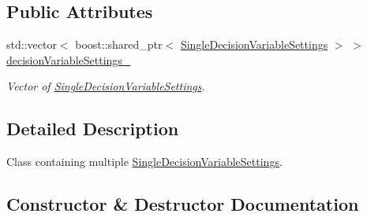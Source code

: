 \subsection*{Public Attributes}
\begin{DoxyCompactItemize}
\item 
std\+::vector$<$ boost\+::shared\+\_\+ptr$<$ \hyperlink{structtudat_1_1optimization_1_1SingleDecisionVariableSettings}{Single\+Decision\+Variable\+Settings} $>$ $>$ \hyperlink{structtudat_1_1optimization_1_1DecisionVariableSettings_a9103cca6e36425aa27406065d448f75c}{decision\+Variable\+Settings\+\_\+}\hypertarget{structtudat_1_1optimization_1_1DecisionVariableSettings_a9103cca6e36425aa27406065d448f75c}{}\label{structtudat_1_1optimization_1_1DecisionVariableSettings_a9103cca6e36425aa27406065d448f75c}

\begin{DoxyCompactList}\small\item\em Vector of \hyperlink{structtudat_1_1optimization_1_1SingleDecisionVariableSettings}{Single\+Decision\+Variable\+Settings}. \end{DoxyCompactList}\end{DoxyCompactItemize}


\subsection{Detailed Description}
Class containing multiple \hyperlink{structtudat_1_1optimization_1_1SingleDecisionVariableSettings}{Single\+Decision\+Variable\+Settings}. 

\subsection{Constructor \& Destructor Documentation}
